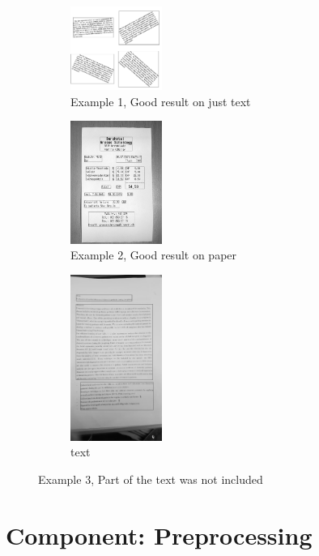\documentclass[Report.tex]{subfiles}
\begin{document}
\begin{figure}[h]
  \centering
  \begin{subfigure}[t]{4cm}
    \includegraphics[width=3cm]{res/segment_text1.png}
    \caption{Example 1, Good result on just text}
  \end{subfigure}
  \hspace{5mm}%
  \begin{subfigure}[t]{4cm}
    \includegraphics[width=3cm]{res/segment_text2.png}
    \caption{Example 2, Good result on paper}
  \end{subfigure}
  \hspace{5mm}%
  \begin{subfigure}[t]{4cm}
    \includegraphics[width=3cm]{res/segment_text3.png}
    \caption{text}
  \end{subfigure}
  \caption{Example 3, Part of the text was not included}
  \label{fig:Text_detection_approaches}
\end{figure}










\section{Component: Preprocessing}
\label{Method:Preprocessing}
\end{document}
